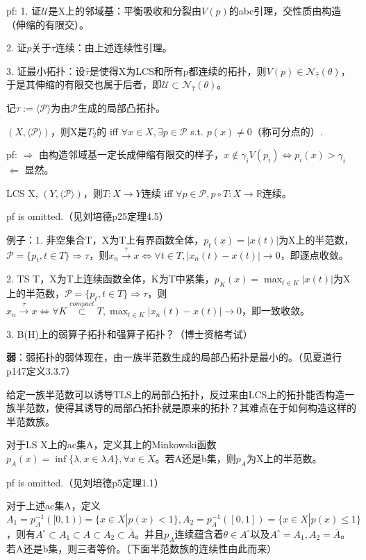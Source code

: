 pf: 1. 证$\mathcal{U}$是X上的邻域基：平衡吸收和分裂由$V(p)$的abc引理，交性质由构造（伸缩的有限交）。

2. 证$p$关于$\tau$连续：由上述连续性引理。

3. 证最小拓扑：设$\hat{\tau}$是使得X为LCS和所有p都连续的拓扑，则$V(p) \in \mathcal{N}_{\hat{\tau}}(\theta)$，于是其伸缩的有限交也属于后者，即$\mathcal{U} \subset \mathcal{N}_{\hat{\tau}}(\theta)$。

记$\tau := \langle \mathcal{P} \rangle$为由$\mathcal{P}$生成的局部凸拓扑。

$(X, \langle \mathcal{P} \rangle)$，则X是$T_2$的 iff $\forall x \in X, \exists p \in \mathcal{P}$ s.t. $p(x) \neq 0$（称可分点的）.

pf: $\Rightarrow$ 由构造邻域基一定长成伸缩有限交的样子，$x \notin \gamma_i V(p_i) \Leftrightarrow p_i(x) > \gamma_i$ $\Leftarrow$ 显然。

LCS X, $(Y, \langle \mathcal{P} \rangle)$，则$T: X \to Y$连续 iff $\forall p \in \mathcal{P}, p \circ T: X \to \mathbb{R}$连续。

pf is omitted.（见刘培德p25定理4.5）

例子：1. 非空集合T，X为T上有界函数全体，$p_t(x) = |x(t)|$为X上的半范数，$\mathcal{P} = \{p_t, t \in T\} \Rightarrow \tau$，则$x_n \overset{\tau}{\to} x \Leftrightarrow \forall t \in T, |x_n(t) - x(t)| \to 0$，即逐点收敛。

2. TS T，X为T上连续函数全体，K为T中紧集，$p_K(x) = \max_{t \in K} |x(t)|$为X上的半范数，$\mathcal{P} = \{p_t, t \in T\} \Rightarrow \tau$，则$x_n \overset{\tau}{\to} x \Leftrightarrow \forall K \overset{compact}{\subset} T, \max_{t \in K} |x_n(t) - x(t)| \to 0$，即一致收敛。

3. B(H)上的弱算子拓扑和强算子拓扑？（博士资格考试）

\textbf{弱}：弱拓扑的弱体现在，由一族半范数生成的局部凸拓扑是最小的。（见夏道行p147定义3.3.7）

给定一族半范数可以诱导TLS上的局部凸拓扑，反过来由LCS上的拓扑能否构造一族半范数，使得其诱导的局部凸拓扑就是原来的拓扑？其难点在于如何构造这样的半范数族。

对于LS X上的ac集A，定义其上的Minkowski函数$p_A(x) = \inf \{ \lambda, x \in \lambda A \}, \forall x \in X$。若A还是b集，则$p_A$为X上的半范数。

pf is omitted.（见刘培德p5定理1.1）

对于上述ac集A，定义$A_1 = p_A^{-1}([0, 1)) = \{x \in X | p(x) < 1\}, A_2 = p_A^{-1}([0, 1]) = \{x \in X | p(x) \le 1\}$，则有$A^{\circ} \subset A_1 \subset A \subset A_2 \subset \bar{A}$。并且$p_A$连续蕴含着$\theta \in A^{\circ}$以及$A^{\circ} = A_1, A_2 = \bar{A}$。若A还是b集，则三者等价。（下面半范数族的连续性由此而来）

